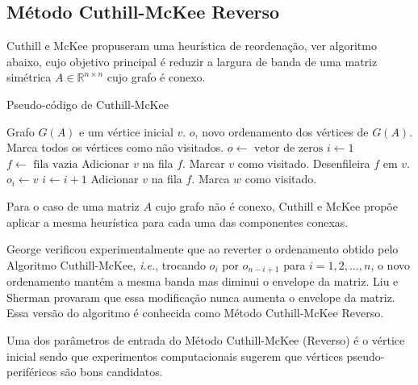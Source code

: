 \subsection{Método Cuthill-McKee Reverso}
Cuthill e McKee \cite{Cuthill:1969:ReducingBandwidth} propuseram uma heurística de
reordenação, ver algoritmo abaixo, cujo objetivo principal é reduzir a largura
de banda de uma matriz simétrica $A \in \mathbb{R}^{n \times n}$ cujo grafo
é conexo.
\begin{algorithm}[hbt]
    \caption{Pseudo-código de Cuthill-McKee}
    \label{alg:rcm}
    \begin{algorithmic}[1]
        \REQUIRE Grafo $G(A)$ e um vértice inicial $v$.
        \ENSURE $o$, novo ordenamento dos vértices de $G(A)$.
        \STATE Marca todos os vértices como não visitados.
        \STATE $o \longleftarrow \text{ vetor de zeros}$
        \STATE $i \longleftarrow 1$
        \STATE $f \longleftarrow \text{ fila vazia}$
        \STATE Adicionar $v$ na fila $f$.
        \STATE Marcar $v$ como visitado.
            \STATE Desenfileira $f$ em $v$.
            \STATE $o_i \longleftarrow v$
            \STATE $i \longleftarrow i + 1$
             \label{alg:rcm:adj}
                    \STATE Adicionar $v$ na fila $f$.
                    \STATE Marca $w$ como visitado.
                \ENDIF
            \ENDFOR
        \ENDWHILE
    \end{algorithmic}
\end{algorithm}

Para o caso de uma matriz $A$ cujo grafo não é conexo, Cuthill e McKee propõe
aplicar a mesma heurística para cada uma das componentes conexas.

George \cite{George:1971:ComputerImplementation} verificou
experimentalmente que ao reverter o ordenamento obtido pelo Algoritmo
Cuthill-McKee, \textit{i.e.}, trocando $o_i$ por $o_{n - i + 1}$ para $i = 1, 2,
\ldots, n$, o novo ordenamento mantém a mesma banda mas diminui o
envelope da matriz. Liu e Sherman \cite{Liu:1976:ComparativeCuthillMcKee}
provaram que essa modificação nunca aumenta o envelope da matriz. Essa versão do
algoritmo é conhecida como Método Cuthill-McKee Reverso.

Uma dos parâmetros de entrada do Método Cuthill-McKee (Reverso) é o vértice inicial sendo
que experimentos computacionais \cite{Cuthill:1969:ReducingBandwidth} sugerem que
vértices pseudo-periféricos são bons candidatos.

